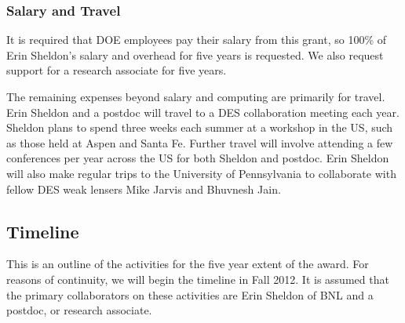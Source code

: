 \documentclass[12pt]{article}
\begin{document}
\subsubsection{Salary and Travel}

It is required that DOE employees pay their salary from this grant, so 100\% of
Erin Sheldon's salary and overhead for five years is requested.  We also request
support for a research associate for five years.

The remaining expenses beyond salary and computing are primarily for travel.
Erin Sheldon and a postdoc will travel to a DES collaboration meeting each
year.  Sheldon plans to spend three weeks each summer at a workshop in the US,
such as those held at Aspen and Santa Fe.  Further travel will involve
attending a few conferences per year across the US for both Sheldon and
postdoc.  Erin Sheldon will also make regular trips to the University of
Pennsylvania to collaborate with fellow DES weak lensers Mike Jarvis and
Bhuvnesh Jain.

\clearpage
\newpage
\subsection{Timeline} \label{sec:timeline}

This is an outline of the activities for the five year extent of the award.
For reasons of continuity, we will begin the timeline in Fall 2012.  It is
assumed that the primary collaborators on these activities are Erin Sheldon of
BNL and a postdoc, or research associate.
\end{document}
